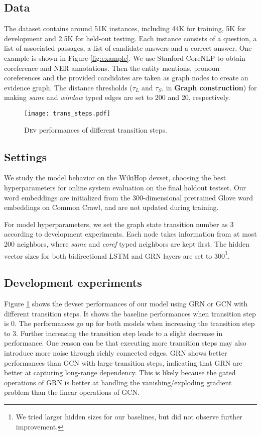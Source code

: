 \documentclass[letterpaper]{article}
\begin{document}
\subsection{Data}

The dataset contains around 51K instances, including 44K for training, 5K for development and 2.5K for held-out testing.
Each instance consists of a question, a list of associated passages, a list of candidate answers and a correct answer.
One example is shown in Figure \ref{fig:example}.
We use Stanford CoreNLP \citep{manning-EtAl:2014:P14-5} to obtain coreference and NER annotations. 
Then the entity mentions, pronoun coreferences and the provided candidates are taken as graph nodes to create an evidence graph.
The distance thresholds ($\tau_L$ and $\tau_S$, in \textbf{Graph construction}) for making \emph{same} and \emph{window} typed edges are set to 200 and 20, respectively.



\begin{figure}
\centering
\texttt{[image: trans\_steps.pdf]}
\caption{\textsc{Dev} performances of different transition steps.}
\label{fig:dev_steps}
\end{figure}


\subsection{Settings}
We study the model behavior on the WikiHop devset, choosing the best hyperparameters for online system evaluation on the final holdout testset.
Our word embeddings are initialized from the 300-dimensional pretrained Glove word embeddings \citep{pennington2014glove} on Common Crawl, and are not updated during training.

For model hyperparameters, we set the graph state transition number as 3 according to development experiments.
Each node takes information from at most 200 neighbors, where \emph{same} and \emph{coref} typed neighbors are kept first. 
The hidden vector sizes for both bidirectional LSTM and GRN layers are set to 300\footnote{We tried larger hidden sizes for our baselines, but did not observe further improvement.}.


\subsection{Development experiments}


Figure \ref{fig:dev_steps} shows the devset performances of our model using GRN or GCN with different transition steps.
It shows the baseline performances when transition step is 0.
The performances go up for both models when increasing the transition step to 3.
Further increasing the transition step leads to a slight decrease in performance.
One reason can be that executing more transition steps may also introduce more noise through richly connected edges.
GRN shows better performances than GCN with large transition steps, indicating that GRN are better at capturing long-range dependency.
This is likely because the gated operations of GRN is better at handling the vanishing/exploding gradient problem than the linear operations of GCN.
\end{document}

